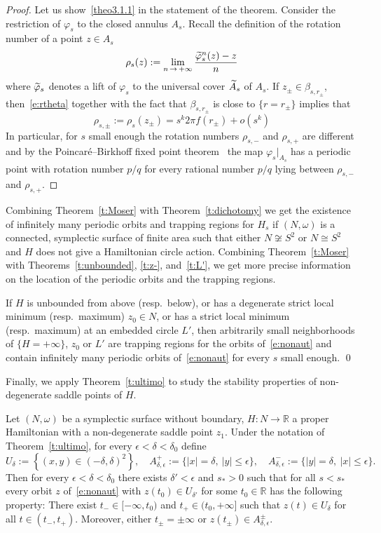 \documentclass[AHL,Unicode,longabstracts,published]{cedram}
\newcommand{\R}{\mathbb{R}}
\let\oldtilde\tilde
\renewcommand*{\tilde}[1]{\mathchoice{\widetilde{#1}}{\widetilde{#1}}{\oldtilde{#1}}{\oldtilde{#1}}}
\begin{document}
\begin{proof}
Let us show~\eqref{theo3.1.1} in the statement of the theorem. Consider the restriction of $\varphi_s$ to the closed annulus $A_s$. Recall the definition of the rotation number of a point $z\in A_s$
\[
\rho_s(z) := \lim_{n\,\to\,+\infty} \frac{\tilde \varphi^n_s(z)-z}{n}
\]
where $\tilde \varphi_s$ denotes a lift of $\varphi_s$ to the universal cover $\tilde A_s$ of $A_s$. If $z_\pm\in\beta_{s,r_\pm}$, then~\eqref{e:rtheta} together with the fact that $\beta_{s,r_\pm}$ is close to $\{r=r_\pm\}$ implies that
\[
\rho_{s,\pm}:=\rho_s\left(z_\pm\right) = s^k2\pi f\left(r_\pm\right) + o(s^k)
\]
In particular, for $s$ small enough the rotation numbers $\rho_{s,-}$ and $\rho_{s,+}$ are different and by the Poincaré--Birkhoff fixed point theorem~\cite[Theorem~7.1]{Gole:2001vx} the map $\varphi_s|_{A_s}$ has a periodic point with rotation number $p/q$ for every rational number $p/q$ lying between $\rho_{s,-}$ and $\rho_{s,+}$.
\end{proof}

Combining Theorem~\ref{t:Moser} with Theorem~\ref{t:dichotomy} we get the existence of infinitely many periodic orbits and trapping regions for $H_s$ if $(N,\omega)$ is a connected, symplectic surface of finite area such that either $N\not\cong S^2$ or $N\cong S^2$ and $H$ does not give a Hamiltonian circle action. Combining Theorem~\ref{t:Moser} with Theorems~\ref{t:unbounded}, \ref{t:z-}, and~\ref{t:L'}, we get more precise information on the location of the periodic orbits and the trapping regions.


\begin{theo}\label{t:three}
If $H$ is unbounded from above (resp.~below), or has a degenerate strict local minimum (resp.~maximum) $z_0\in N$, or has a strict local minimum (resp.~maximum) at an embedded circle $L'$, then arbitrarily small neighborhoods of $\{H=+\infty\}$, $z_0$ or $L'$ are trapping regions for the orbits of~\eqref{e:nonaut} and contain infinitely many periodic orbits of~\eqref{e:nonaut} for every $s$ small enough. \qed
\end{theo}

Finally, we apply Theorem~\ref{t:ultimo} to study the stability properties of non-degenerate saddle points of $H$.

\begin{theo}\label{t:saddle}
Let $(N,\omega)$ be a symplectic surface without boundary, $H:N\to\R$ a proper Hamiltonian with a non-degenerate saddle point $z_1$. Under the notation of Theorem~\ref{t:ultimo}, for every $\epsilon<\delta<\delta_0$ define
\[
U_\delta:=\left\{(x,y)\in(-\delta,\delta)^2\right\},\quad A_{\delta,\epsilon}^+:=\big\{|x|=\delta,\ |y|\leq \epsilon\big\},\quad A_{\delta,\epsilon}^-:=\big\{|y|=\delta,\ |x|\leq \epsilon\big\}.
\]
Then for every $\epsilon<\delta<\delta_0$ there exists $\delta'<\epsilon$ and $s_*>0$ such that for all $s<s_*$ every orbit $z$ of~\eqref{e:nonaut} with $z(t_0)\in U_{\delta'}$ for some $t_0\in \R$ has the following property: There exist $t_-\in[-\infty,t_0)$ and $t_+\in(t_0,+\infty]$ such that $z(t)\in U_\delta$ for all $t\in(t_-,t_+)$. Moreover, either $t_\pm=\pm\infty$ or $z(t_\pm)\in A^\pm_{\delta,\epsilon}$.
\end{theo}
\end{document}
